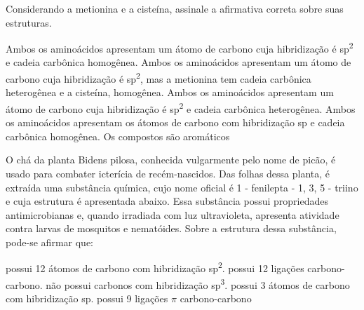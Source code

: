 \documentclass[10pt]{scrartcl}
\begin{document}
\begin{exercise}[points=1]
Considerando a metionina e a cisteína, assinale a afirmativa correta sobre suas estruturas.


\begin{center}
 \par

\end{center}
\begin{choice}
\choice Ambos os aminoácidos apresentam um átomo de carbono cuja hibridização é sp\textsuperscript{2} e cadeia carbônica homogênea.
\choice Ambos os aminoácidos apresentam um átomo de carbono cuja hibridização é sp\textsuperscript{2}, mas a metionina tem cadeia carbônica heterogênea e a cisteína, homogênea.
\choice Ambos os aminoácidos apresentam um átomo de carbono cuja hibridização é sp\textsuperscript{2} e cadeia carbônica heterogênea.
\choice Ambos os aminoácidos apresentam os átomos de carbono com hibridização sp e cadeia carbônica homogênea.
\choice Os compostos são aromáticos
\end{choice}
\end{exercise}
\begin{solution}

\end{solution}










\begin{exercise}[points=1]
O chá da planta Bidens pilosa, conhecida vulgarmente pelo nome de picão, é usado para combater icterícia de recém-nascidos. Das folhas dessa planta, é extraída uma substância química, cujo nome oficial é 1 - fenilepta - 1, 3, 5 - triino e cuja estrutura é apresentada abaixo. Essa substância possui propriedades antimicrobianas e, quando irradiada com luz ultravioleta, apresenta atividade contra larvas de mosquitos e nematóides.
Sobre a estrutura dessa substância, pode-se afirmar que:

\begin{center}
\end{center}

\begin{choice}
\choice possui 12 átomos de carbono com hibridização sp\textsuperscript{2}.
\choice possui 12 ligações  carbono-carbono.
\choice não possui carbonos com hibridização sp\textsuperscript{3}.
\choice possui 3 átomos de carbono com hibridização sp.
\choice possui 9 ligações \(\pi\) carbono-carbono
\end{choice}
\end{exercise}
\begin{solution}

\end{solution}
\end{document}

